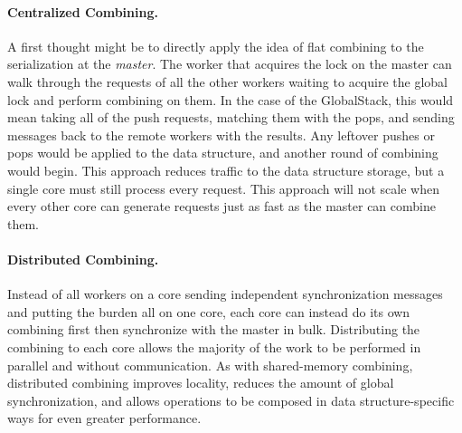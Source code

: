 \paragraph{Centralized Combining.}
A first thought might be to directly apply the idea of flat combining to the serialization at the \emph{master}. The worker that acquires the lock on the master can walk through the requests of all the other workers waiting to acquire the global lock and perform combining on them. In the case of the GlobalStack, this would mean taking all of the push requests, matching them with the pops, and sending messages back to the remote workers with the results. Any leftover pushes or pops would be applied to the data structure, and another round of combining would begin. This approach reduces traffic to the data structure storage, but a single core must still process every request. This approach will not scale when every other core can generate requests just as fast as the master can combine them.

\paragraph{Distributed Combining.}
Instead of all workers on a core sending independent synchronization messages and putting the burden all on one core, each core can instead do its own combining first then synchronize with the master in bulk.
Distributing the combining to each core allows the majority of the work to be performed in parallel and without communication.
As with shared-memory combining, distributed combining improves locality, reduces the amount of global synchronization, and allows operations to be composed in data structure-specific ways for even greater performance.


